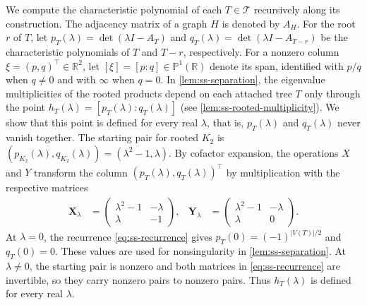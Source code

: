 \documentclass[10pt,a4paper]{article}
\theoremstyle{plain}
\theoremstyle{definition}
\newcommand{\R}{\mathbb{R}}
\begin{document}
We compute the characteristic polynomial of each $T\in\mathcal T$
recursively along its construction.
The adjacency matrix of a graph $H$ is denoted by $A_H$.
For the root $r$ of $T$, let $p_T(\lambda)=\det(\lambda I-A_T)$ and
$q_T(\lambda)=\det(\lambda I-A_{T-r})$ be the characteristic polynomials of $T$ and
$T-r$, respectively.
For a nonzero column $\xi=(p,q)^{\top}\in\R^2$, let
$[\xi]=[p:q]\in\mathbb P^1(\R)$ denote its span, identified with $p/q$ when $q\ne0$
and with $\infty$ when $q=0$.
In \cref{lem:ss-separation}, the eigenvalue multiplicities of the
rooted products depend on each attached tree $T$ only through the point
$h_T(\lambda)=[p_T(\lambda):q_T(\lambda)]$
(see \cref{lem:ss-rooted-multiplicity}).
We show that this point is defined for every real $\lambda$, that is,
$p_T(\lambda)$ and $q_T(\lambda)$ never vanish together.
The starting pair for rooted $K_2$ is
$(p_{K_2}(\lambda),q_{K_2}(\lambda))=(\lambda^2-1,\lambda)$.
By cofactor expansion, the operations $X$ and $Y$
transform the column $(p_T(\lambda),q_T(\lambda))^{\top}$ by multiplication
with the respective matrices
\begin{equation}\label{eq:ss-recurrence}
 \begin{aligned}
 \mathbf{X}_\lambda&=\begin{pmatrix}\lambda^2-1&-\lambda\\\lambda&-1\end{pmatrix},
 &\mathbf{Y}_\lambda&=\begin{pmatrix}\lambda^2-1&-\lambda\\\lambda&0\end{pmatrix}.
 \end{aligned}
\end{equation}
At $\lambda=0$, the recurrence \cref{eq:ss-recurrence} gives
$p_T(0)=(-1)^{|V(T)|/2}$ and $q_T(0)=0$.
These values are used for nonsingularity in \cref{lem:ss-separation}.
At $\lambda\ne0$, the starting pair is nonzero and both
matrices in \cref{eq:ss-recurrence} are invertible, so they carry
nonzero pairs to nonzero pairs.
Thus $h_T(\lambda)$ is defined for every real $\lambda$.
\end{document}
